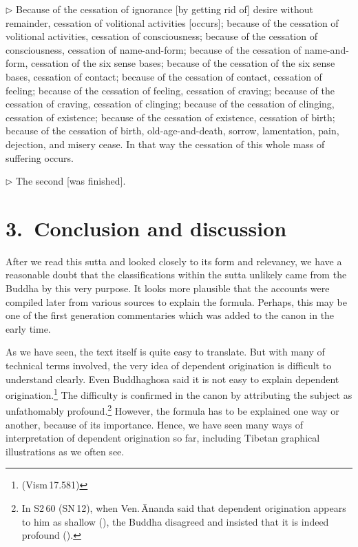 \addtocounter{sennum}{-2}
$\triangleright$  Because of the cessation of ignorance [by getting rid of] desire without remainder, cessation of volitional activities [occurs]; because of the cessation of volitional activities, cessation of consciousness; because of the cessation of consciousness, cessation of name-and-form; because of the cessation of name-and-form, cessation of the six sense bases; because of the cessation of the six sense bases, cessation of contact; because of the cessation of contact, cessation of feeling; because of the cessation of feeling, cessation of craving; because of the cessation of craving, cessation of clinging; because of the cessation of clinging, cessation of existence; because of the cessation of existence, cessation of birth; because of the cessation of birth, old-age-and-death, sorrow, lamentation, pain, dejection, and misery cease.  In that way the cessation of this whole mass of suffering occurs.\\


\addtocounter{sennum}{-1}
$\triangleright$  The second [was finished].\\

{}
\section*{3.\ Conclusion and discussion}

After we read this sutta and looked closely to its form and relevancy, we have a reasonable doubt that the classifications within the sutta unlikely came from the Buddha by this very purpose. It looks more plausible that the accounts were compiled later from various sources to explain the formula. Perhaps, this may be one of the first generation commentaries which was added to the canon in the early time.

As we have seen, the text itself is quite easy to translate. But with many of technical terms involved, the very idea of dependent origination is difficult to understand clearly. Even Buddhaghosa said it is not easy to explain dependent origination.\footnote{ (Vism\,17.581)} The difficulty is confirmed in the canon by attributing the subject as unfathomably profound.\footnote{In S2\,60 (SN\,12), when Ven.\,\=Ananda said that dependent origination appears to him as shallow (), the Buddha disagreed and insisted that it is indeed profound ().} However, the formula has to be explained one way or another, because of its importance. Hence, we have seen many ways of interpretation of dependent origination so far, including Tibetan graphical illustrations as we often see.

